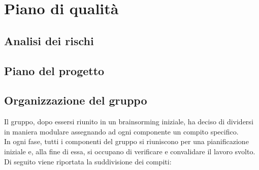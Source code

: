 
\chapter{Piano di qualità}\label{chap:piano-qualita}

\section{Analisi dei rischi}\label{sec:analisi-rischi}

\section{Piano del progetto}\label{sec:piano-progetto}

\section{Organizzazione del gruppo}\label{sec:organizzazione-gruppo}
Il gruppo, dopo essersi riunito in un brainsorming iniziale, ha deciso di 
dividersi in maniera modulare assegnando ad ogni componente un compito 
specifico.\\
In ogni fase, tutti i componenti del gruppo si riuniscono per una 
pianificazione iniziale e, alla fine di essa, si occupano  di verificare e 
convalidare il lavoro svolto.\\
Di seguito viene riportata la suddivisione dei compiti:

